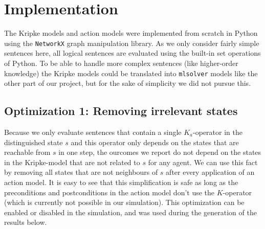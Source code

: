 \documentclass[a4paper]{scrartcl}
\begin{document}
\section*{Implementation}
The Kripke models and action models were implemented from scratch in Python using the \texttt{NetworkX} graph manipulation library\cite{NetworkX}.  As we only consider fairly simple sentences here, all logical sentences are evaluated using the built-in set operations of Python. To be able to handle more complex sentences (like higher-order knowledge) the Kripke models could be translated into \texttt{mlsolver} models like the other part of our project, but for the sake of simplicity we did not pursue this. 

\subsection*{Optimization 1: Removing irrelevant states}
Because we only evaluate sentences that contain a single $K_a$-operator in the distinguished state $s$ and this operator only depends on the states that are reachable from $s$ in one step, the ourcomes we report do not depend on the states in the Kripke-model that are not related to $s$ for any agent. We can use this fact by removing all states that are not neighbours of $s$ after every application of an action model. It is easy to see that this simplification is safe as long as the preconditions and postconditions in the action model don't use the $K$-operator (which is currently not possible in our simulation). This optimization can be enabled or disabled in the simulation, and was used during the generation of the results below.
\end{document}
